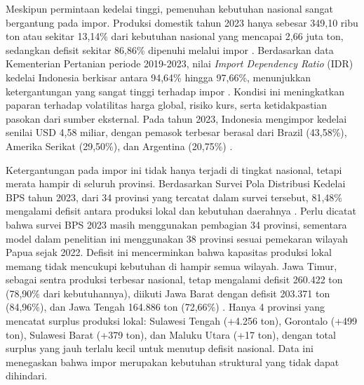\documentclass{file/TA-ITS}
\theoremstyle{definition}
\theoremstyle{definition}
\theoremstyle{plain}
\begin{document}
Meskipun permintaan kedelai tinggi, pemenuhan kebutuhan nasional sangat bergantung pada impor. Produksi domestik tahun 2023 hanya sebesar 349,10 ribu ton atau sekitar 13,14\% dari kebutuhan nasional yang mencapai 2,66 juta ton, sedangkan defisit sekitar 86,86\% dipenuhi melalui impor \cite{kementan2024kedelai,pusdatin2024konsumsi}. Berdasarkan data Kementerian Pertanian periode 2019-2023, nilai \textit{Import Dependency Ratio} (IDR) kedelai Indonesia berkisar antara 94,64\% hingga 97,66\%, menunjukkan ketergantungan yang sangat tinggi terhadap impor \cite{kementan2024kedelai}.
Kondisi ini meningkatkan paparan terhadap volatilitas harga global, risiko kurs, serta ketidakpastian pasokan dari sumber eksternal. Pada tahun 2023, Indonesia mengimpor kedelai senilai USD 4,58 miliar, dengan pemasok terbesar berasal dari Brazil (43,58\%), Amerika Serikat (29,50\%), dan Argentina (20,75\%) \cite{kementan2024kedelai}.

Ketergantungan pada impor ini tidak hanya terjadi di tingkat nasional, tetapi merata hampir di seluruh provinsi. Berdasarkan Survei Pola Distribusi Kedelai BPS tahun 2023, dari 34 provinsi yang tercatat dalam survei tersebut, 81,48\% mengalami defisit antara produksi lokal dan kebutuhan daerahnya \cite{bps2023distribusi}. Perlu dicatat bahwa survei BPS 2023 masih menggunakan pembagian 34 provinsi, sementara model dalam penelitian ini menggunakan 38 provinsi sesuai pemekaran wilayah Papua sejak 2022. Defisit ini mencerminkan bahwa kapasitas produksi lokal memang tidak mencukupi kebutuhan di hampir semua wilayah. Jawa Timur, sebagai sentra produksi terbesar nasional, tetap mengalami defisit 260.422 ton (78,90\% dari kebutuhannya), diikuti Jawa Barat dengan defisit 203.371 ton (84,96\%), dan Jawa Tengah 164.886 ton (72,66\%) \cite{bps2023distribusi}. Hanya 4 provinsi yang mencatat surplus produksi lokal: Sulawesi Tengah (+4.256 ton), Gorontalo (+499 ton), Sulawesi Barat (+379 ton), dan Maluku Utara (+17 ton), dengan total surplus yang jauh terlalu kecil untuk menutup defisit nasional. Data ini menegaskan bahwa impor merupakan kebutuhan struktural yang tidak dapat dihindari.
\end{document}
